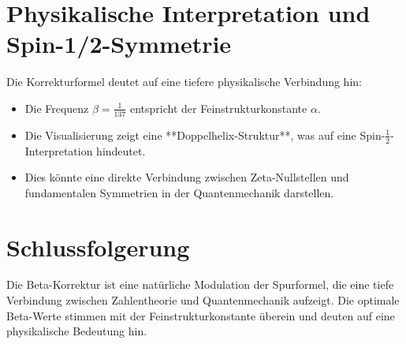 \documentclass[a4paper,12pt]{article}
\begin{document}
\section{Physikalische Interpretation und Spin-1/2-Symmetrie}
Die Korrekturformel deutet auf eine tiefere physikalische Verbindung hin:
\begin{itemize}
    \item Die Frequenz $\beta = \frac{1}{137}$ entspricht der Feinstrukturkonstante $\alpha$.
    \item Die Visualisierung zeigt eine **Doppelhelix-Struktur**, was auf eine Spin-$\frac{1}{2}$-Interpretation hindeutet.
    \item Dies könnte eine direkte Verbindung zwischen Zeta-Nullstellen und fundamentalen Symmetrien in der Quantenmechanik darstellen.
\end{itemize}

\section{Schlussfolgerung}
Die Beta-Korrektur ist eine natürliche Modulation der Spurformel, die eine tiefe Verbindung zwischen Zahlentheorie und Quantenmechanik aufzeigt. Die optimale Beta-Werte stimmen mit der Feinstrukturkonstante überein und deuten auf eine physikalische Bedeutung hin.
\end{document}
